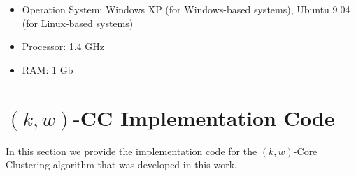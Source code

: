 \begin{itemize}
\item Operation System: Windows XP (for Windows-based systems), Ubuntu 9.04 (for Linux-based systems)
\item Processor: 1.4 GHz 
\item RAM: 1 Gb 
\end{itemize}


\chapter{$(k,w)$-CC Implementation Code}
\label{chap:code}

In this section we provide the implementation code for the $(k,w)$-Core Clustering algorithm that was developed in this work.

\vspace*{10pt}

